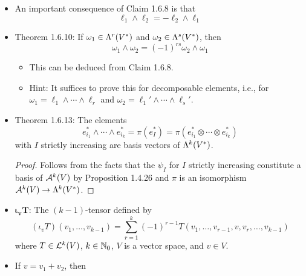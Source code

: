 \documentclass[../notes.tex]{subfiles}
\begin{document}
\begin{itemize}
\begin{proof}
\begin{align*}
            &= \pi[(-1)^\sigma T+W]\\
            &= (-1)^\sigma\pi(T)\\
            &= (-1)^\sigma\pi(\ell_1\otimes\cdots\otimes\ell_k)\\
            &= (-1)^\sigma\ell_1\wedge\cdots\wedge\ell_k
        \end{align*}
        as desired.
    \end{proof}
    \item An important consequence of Claim 1.6.8 is that
    \begin{equation*}
        \ell_1\wedge\ell_2 = -\ell_2\wedge\ell_1
    \end{equation*}
    \item Theorem 1.6.10: If $\omega_1\in\lam[r]{V^*}$ and $\omega_2\in\lam[s]{V^*}$, then
    \begin{equation*}
        \omega_1\wedge\omega_2 = (-1)^{rs}\omega_2\wedge\omega_1
    \end{equation*}
    \begin{itemize}
        \item This can be deduced from Claim 1.6.8.
        \item Hint: It suffices to prove this for decomposable elements, i.e., for $\omega_1=\ell_1\wedge\cdots\wedge\ell_r$ and $\omega_2=\ell_1'\wedge\cdots\wedge\ell_s'$.
    \end{itemize}
    \item Theorem 1.6.13: The elements
    \begin{equation*}
        e_{i_1}^*\wedge\cdots\wedge e_{i_k}^* = \pi(e_I^*) = \pi(e_{i_1}^*\otimes\cdots\otimes e_{i_k}^*)
    \end{equation*}
    with $I$ strictly increasing are basis vectors of $\lam[k]{V^*}$.
    \begin{proof}
        Follows from the facts that the $\psi_I$ for $I$ strictly increasing constitute a basis of $\alt[k]{V}$ by Proposition 1.4.26 and $\pi$ is an isomorphism $\alt[k]{V}\to\lam[k]{V^*}$.
    \end{proof}
    \item $\bm{\iota_vT}$: The $(k-1)$-tensor defined by
    \begin{equation*}
        (\iota_vT)(v_1,\dots,v_{k-1}) = \sum_{r=1}^k(-1)^{r-1}T(v_1,\dots,v_{r-1},v,v_r,\dots,v_{k-1})
    \end{equation*}
    where $T\in\lin[k]{V}$, $k\in\N_0$, $V$ is a vector space, and $v\in V$.
    \item If $v=v_1+v_2$, then

\end{itemize}
\end{document}
